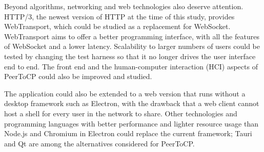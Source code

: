 Beyond algorithms, networking and web technologies also deserve attention. HTTP/3, the newest version of HTTP at the time of this study, provides WebTransport, which could be studied as a replacement for WebSocket. WebTransport aims to offer a better programming interface, with all the features of WebSocket and a lower latency. Scalability to larger numbers of users could be tested by changing the test harness so that it no longer drives the user interface end to end. The front end and the human-computer interaction (HCI) aspects of PeerToCP could also be improved and studied.

The application could also be extended to a web version that runs without a desktop framework such as Electron, with the drawback that a web client cannot host a shell for every user in the network to share. Other technologies and programming languages with better performance and lighter resource usage than Node.js and Chromium in Electron could replace the current framework; Tauri and Qt are among the alternatives considered for PeerToCP.

